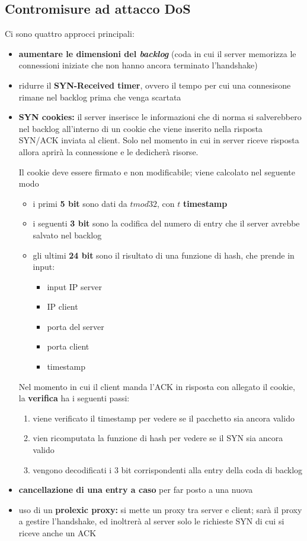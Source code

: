 \subsection{Contromisure ad attacco DoS}
Ci sono quattro approcci principali:
\begin{itemize}
    \item \textbf{aumentare le dimensioni del \textit{backlog}} (coda in cui il server memorizza le connessioni 
    iniziate che non hanno ancora terminato l'handshake)
    \item ridurre il \textbf{SYN-Received timer}, ovvero il tempo per cui una connesisone rimane nel backlog prima 
    che venga scartata 
    \item \textbf{SYN cookies:} il server inserisce le informazioni che di norma si salverebbero nel backlog 
    all'interno di un cookie che viene inserito nella risposta SYN/ACK inviata al client. Solo nel 
    momento in cui in server riceve risposta allora aprirà la connessione e le dedicherà risorse.

    \noindent Il cookie deve essere firmato e non modificabile; viene calcolato nel seguente modo 
    \begin{itemize}
        \item i primi \textbf{5 bit} sono dati da $t mod 32$, con $t$ \textbf{timestamp}
        \item i seguenti \textbf{3 bit} sono la codifica del numero di entry che il server avrebbe salvato nel backlog 
        \item gli ultimi \textbf{24 bit} sono il risultato di una funzione di hash, che prende in input:
        \begin{itemize}
            \item input IP server
            \item IP client
            \item porta del server
            \item porta client
            \item timestamp
        \end{itemize}
    \end{itemize}

    \noindent Nel momento in cui il client manda l'ACK in risposta con allegato il cookie, la \textbf{verifica}
        ha i seguenti passi:
        \begin{enumerate}
            \item viene verificato il timestamp per vedere se il pacchetto sia ancora valido 
            \item vien ricomputata la funzione di hash per vedere se il SYN sia ancora valido 
            \item vengono decodificati i 3 bit corrispondenti alla entry della coda di backlog
        \end{enumerate}
    \item \textbf{cancellazione di una entry a caso} per far posto a una nuova 
    \item uso di un \textbf{prolexic proxy:} si mette un proxy tra server e client; sarà il proxy a gestire 
    l'handshake, ed inoltrerà al server solo le richieste SYN di cui si riceve anche un ACK
\end{itemize}


